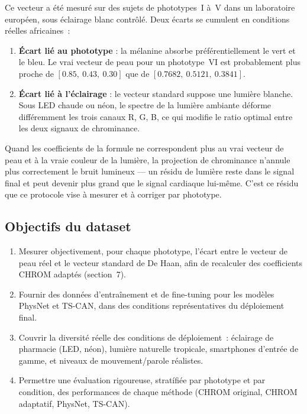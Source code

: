 \documentclass[11pt,a4paper]{article}
\begin{document}
Ce vecteur a \'et\'e mesur\'e sur des sujets de phototypes~I \`a~V dans un
laboratoire europ\'een, sous \'eclairage blanc contr\^ol\'e. Deux \'ecarts
se cumulent en conditions r\'eelles africaines~:

\begin{enumerate}
\item \textbf{\'Ecart li\'e au phototype} : la m\'elanine absorbe
pr\'ef\'erentiellement le vert et le bleu. Le vrai vecteur de peau pour un
phototype~VI est probablement plus proche de $[0.85,\ 0.43,\ 0.30]$ que de
$[0.7682,\ 0.5121,\ 0.3841]$.
\item \textbf{\'Ecart li\'e \`a l'\'eclairage} : le vecteur standard suppose
une lumi\`ere blanche. Sous LED chaude ou n\'eon, le spectre de la lumi\`ere
ambiante d\'eforme diff\'eremment les trois canaux R, G, B, ce qui modifie
le ratio optimal entre les deux signaux de chrominance.
\end{enumerate}

Quand les coefficients de la formule ne correspondent plus au vrai vecteur
de peau et \`a la vraie couleur de la lumi\`ere, la projection de chrominance
n'annule plus correctement le bruit lumineux --- un r\'esidu de lumi\`ere
reste dans le signal final et peut devenir plus grand que le signal cardiaque
lui-m\^eme. C'est ce r\'esidu que ce protocole vise \`a mesurer et \`a
corriger par phototype.

\subsection{Objectifs du dataset}

\begin{enumerate}
\item Mesurer objectivement, pour chaque phototype, l'\'ecart entre le
vecteur de peau r\'eel et le vecteur standard de De Haan, afin de recalculer
des coefficients CHROM adapt\'es (section~7).
\item Fournir des donn\'ees d'entra\^inement et de fine-tuning pour les
mod\`eles PhysNet et TS-CAN, dans des conditions repr\'esentatives du
d\'eploiement final.
\item Couvrir la diversit\'e r\'eelle des conditions de d\'eploiement~:
\'eclairage de pharmacie (LED, n\'eon), lumi\`ere naturelle tropicale,
smartphones d'entr\'ee de gamme, et niveaux de mouvement/parole r\'ealistes.
\item Permettre une \'evaluation rigoureuse, strat\'ifi\'ee par phototype et
par condition, des performances de chaque m\'ethode (CHROM original, CHROM
adaptatif, PhysNet, TS-CAN).
\end{enumerate}
\end{document}
